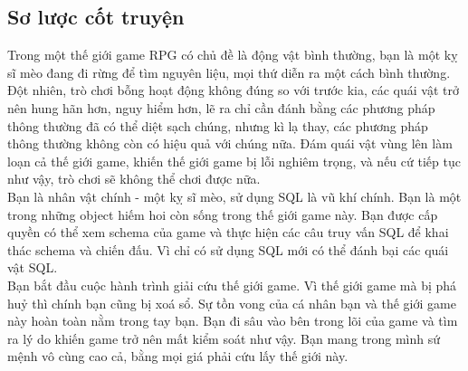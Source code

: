 \subsection{Sơ lược cốt truyện}
\hspace*{0.5cm} Trong một thế giới game RPG có chủ đề là động vật bình thường, bạn là một kỵ sĩ mèo đang đi rừng để tìm nguyên liệu, mọi thứ diễn ra một cách bình thường. \\
\hspace*{0.5cm} Đột nhiên, trò chơi bỗng hoạt động không đúng so với trước kia, các quái vật trở nên hung hãn hơn, nguy hiểm hơn, lẽ ra chỉ cần đánh bằng các phương pháp thông thường đã có thể diệt sạch chúng, nhưng kì lạ thay, các phương pháp thông thường không còn có hiệu quả với chúng nữa. Đám quái vật vùng lên làm loạn cả thế giới game, khiến thế giới game bị lỗi nghiêm trọng, và nếu cứ tiếp tục như vậy, trò chơi sẽ không thể chơi được nữa.\\
\hspace*{0.5cm} Bạn là nhân vật chính - một kỵ sĩ mèo, sử dụng SQL là vũ khí chính. Bạn là một trong những object hiếm hoi còn sống trong thế giới game này. Bạn được cấp quyền có thể xem schema của game và thực hiện các câu truy vấn SQL để khai thác schema và chiến đấu. Vì chỉ có sử dụng SQL mới có thể đánh bại các quái vật SQL. \\
\hspace*{0.5cm} Bạn bắt đầu cuộc hành trình giải cứu thế giới game. Vì thế giới game mà bị phá huỷ thì chính bạn cũng bị xoá sổ. Sự tồn vong của cá nhân bạn và thế giới game này hoàn toàn nằm trong tay bạn. Bạn đi sâu vào bên trong lõi của game và tìm ra lý do khiến game trở nên mất kiểm soát như vậy. Bạn mang trong mình sứ mệnh vô cùng cao cả, bằng mọi giá phải cứu lấy thế giới này.

